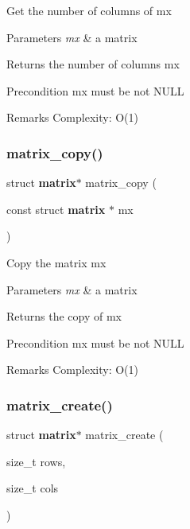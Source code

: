 Get the number of columns of {\ttfamily mx}


\begin{DoxyParams}{Parameters}
{\em mx} & a matrix \\
\hline
\end{DoxyParams}
\begin{DoxyReturn}{Returns}
the number of columns {\ttfamily mx}
\end{DoxyReturn}
\begin{DoxyPrecond}{Precondition}
{\ttfamily mx} must be not N\+U\+LL
\end{DoxyPrecond}
\begin{DoxyRemark}{Remarks}
Complexity\+: O(1) 
\end{DoxyRemark}
\mbox{\label{matrix_8h_a6663b065febb290385857b26fdb1a353}} 
\subsubsection{matrix\+\_\+copy()}
{\footnotesize\ttfamily struct \textbf{ matrix}$\ast$ matrix\+\_\+copy (\begin{DoxyParamCaption}\item[{const struct \textbf{ matrix} $\ast$}]{mx }\end{DoxyParamCaption})}

Copy the matrix {\ttfamily mx}


\begin{DoxyParams}{Parameters}
{\em mx} & a matrix \\
\hline
\end{DoxyParams}
\begin{DoxyReturn}{Returns}
the copy of {\ttfamily mx}
\end{DoxyReturn}
\begin{DoxyPrecond}{Precondition}
{\ttfamily mx} must be not N\+U\+LL
\end{DoxyPrecond}
\begin{DoxyRemark}{Remarks}
Complexity\+: O(1) 
\end{DoxyRemark}
\mbox{\label{matrix_8h_ad2d40d9c13eba774d6bb788021242a95}} 
\subsubsection{matrix\+\_\+create()}
{\footnotesize\ttfamily struct \textbf{ matrix}$\ast$ matrix\+\_\+create (\begin{DoxyParamCaption}\item[{size\+\_\+t}]{rows,  }\item[{size\+\_\+t}]{cols }\end{DoxyParamCaption})}

